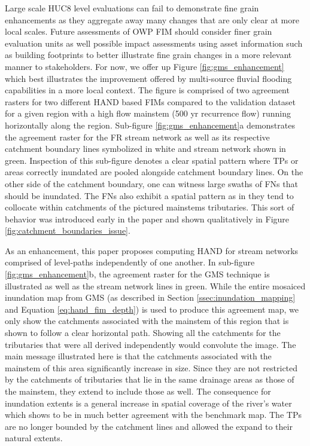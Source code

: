 Large scale HUC8 level evaluations can fail to demonstrate fine grain enhancements as they aggregate away many changes that are only clear at more local scales.
Future assessments of OWP FIM should consider finer grain evaluation units as well possible impact assessments using asset information such as building footprints to better illustrate fine grain changes in a more relevant manner to stakeholders.
For now, we offer up Figure \ref{fig:gms_enhancement} which best illustrates the improvement offered by multi-source fluvial flooding capabilities in a more local context.
The figure is comprised of two agreement rasters for two different HAND based FIMs compared to the validation dataset for a given region with a high flow mainstem (500 yr recurrence flow) running horizontally along the region.
Sub-figure \ref{fig:gms_enhancement}a demonstrates the agreement raster for the FR stream network as well as its respective catchment boundary lines symbolized in white and stream network shown in green.
Inspection of this sub-figure denotes a clear spatial pattern where TPs or areas correctly inundated are pooled alongside catchment boundary lines. 
On the other side of the catchment boundary, one can witness large swaths of FNs that should be inundated. 
The FNs also exhibit a spatial pattern as in they tend to collocate within catchments of the pictured mainstems tributaries.
This sort of behavior was introduced early in the paper and shown qualitatively in Figure \ref{fig:catchment_boundaries_issue}.

As an enhancement, this paper proposes computing HAND for stream networks comprised of level-paths independently of one another.
In sub-figure \ref{fig:gms_enhancement}b, the agreement raster for the GMS technique is illustrated as well as the stream network lines in green.
While the entire mosaiced inundation map from GMS (as described in Section \ref{ssec:inundation_mapping} and Equation \ref{eq:hand_fim_depth}) is used to produce this agreement map, we only show the catchments associated with the mainstem of this region that is shown to follow a clear horizontal path.
Showing all the catchments for the tributaries that were all derived independently would convolute the image.
The main message illustrated here is that the catchments associated with the mainstem of this area significantly increase in size.
Since they are not restricted by the catchments of tributaries that lie in the same drainage areas as those of the mainstem, they extend to include those as well.
The consequence for inundation extents is a general increase in spatial coverage of the river's water which shows to be in much better agreement with the benchmark map.
The TPs are no longer bounded by the catchment lines and allowed the expand to their natural extents.

